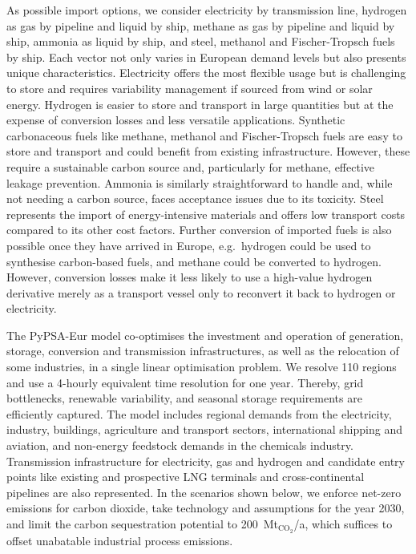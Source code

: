 

As possible import options, we consider electricity by transmission line,
hydrogen as gas by pipeline and liquid by ship, methane as gas by pipeline and
liquid by ship, ammonia as liquid by ship, and steel, methanol and
Fischer-Tropsch fuels by ship. Each vector not only varies in European demand
levels but also presents unique characteristics. Electricity offers the most
flexible usage but is challenging to store and requires variability management
if sourced from wind or solar energy. Hydrogen is easier to store and transport
in large quantities but at the expense of conversion losses and less versatile
applications. Synthetic carbonaceous fuels like methane, methanol and
Fischer-Tropsch fuels are easy to store and transport and could benefit from
existing infrastructure. However, these require a sustainable carbon source and,
particularly for methane, effective leakage prevention. Ammonia is similarly
straightforward to handle and, while not needing a carbon source, faces
acceptance issues due to its toxicity. Steel represents the import of
energy-intensive materials and offers low transport costs compared to its other
cost factors. Further conversion of imported fuels is also possible once they
have arrived in Europe, e.g.~hydrogen could be used to synthesise carbon-based
fuels, and methane could be converted to hydrogen. However, conversion losses
make it less likely to use a high-value hydrogen derivative merely as a
transport vessel only to reconvert it back to hydrogen or electricity.


The PyPSA-Eur\cite{PyPSAEurSecSectorCoupled} model co-optimises the investment
and operation of generation, storage, conversion and transmission
infrastructures, as well as the relocation of some
industries,\cite{verpoortEstimatingRenewables2023,samadiRenewablesPull2023} in a
single linear optimisation problem. We resolve 110 regions and use a 4-hourly
equivalent time resolution for one year. Thereby, grid bottlenecks, renewable
variability, and seasonal storage requirements are efficiently captured. The
model includes regional demands from the electricity, industry, buildings,
agriculture and transport sectors, international shipping and aviation, and
non-energy feedstock demands in the chemicals industry. Transmission
infrastructure for electricity, gas and hydrogen and candidate entry points like
existing and prospective LNG terminals and cross-continental pipelines are also
represented. In the scenarios shown below, we enforce net-zero emissions for
carbon dioxide, take technology and assumptions for the year 2030,\cite{dea2019}
and limit the carbon sequestration potential to 200~Mt$_{\text{CO}_2}$/a, which
suffices to offset unabatable industrial process emissions. 

